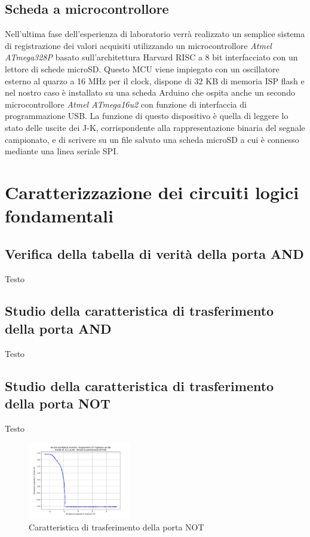 \documentclass[journal]{IEEEtran}
\begin{document}
\subsection{Scheda a microcontrollore}
Nell'ultima fase dell'esperienza di laboratorio verrà realizzato un semplice sistema di registrazione dei valori acquisiti utilizzando un microcontrollore \textit{Atmel ATmega328P} basato sull'architettura Harvard RISC a 8 bit interfacciato con un lettore di schede microSD. Questo MCU viene impiegato con un oscillatore esterno al quarzo a 16 MHz per il clock, dispone di 32 KB di memoria ISP flash e nel nostro caso è installato su una scheda Arduino che ospita anche un secondo microcontrollore \textit{Atmel ATmega16u2} con funzione di interfaccia di programmazione USB. La funzione di questo dispositivo è quella di leggere lo stato delle uscite dei J-K, corrispondente alla rappresentazione binaria del segnale campionato, e di scrivere su un file salvato una scheda microSD a cui è connesso mediante una linea seriale SPI.


\section{Caratterizzazione dei circuiti logici fondamentali}

\subsection{Verifica della tabella di verità della porta AND}
Testo


\subsection{Studio della caratteristica di trasferimento della porta AND}
Testo


\subsection{Studio della caratteristica di trasferimento della porta NOT}
Testo

\begin{figure}[H]%
\begin{center}
\includegraphics[width=0.40\textwidth]{analysis/output/inverter_ring_xy.pdf}
\caption{Caratteristica di trasferimento della porta NOT}
\label{fig:inverter_ring_xy}
\end{center}
\end{figure}
\end{document}

